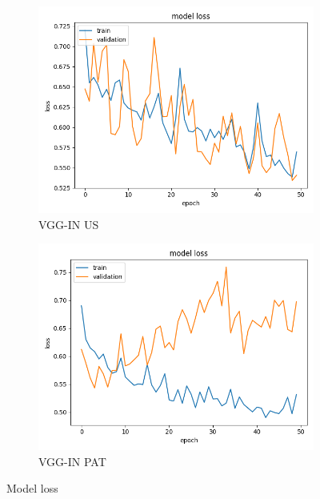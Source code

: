 \begin{figure}
\begin{subfigure}[b]{.45\linewidth}
\includegraphics[width=\linewidth]{Figs/vgg_in_us_loss.jpg}
\caption{VGG-IN US}
\end{subfigure}
\begin{subfigure}[b]{.45\linewidth}
\includegraphics[width=\linewidth]{Figs/vgg_in_pat_loss.jpg}
\caption{VGG-IN PAT}
\end{subfigure}
\caption{Model loss}
\label{fig:loss}
\end{figure}

